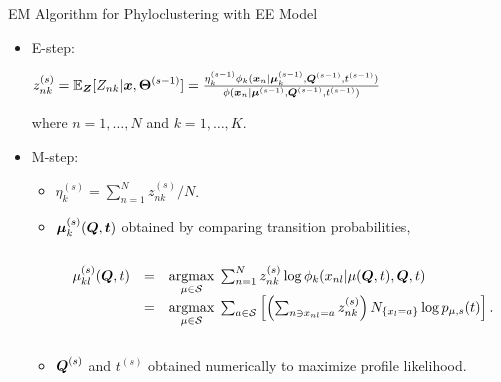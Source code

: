 \documentclass{beamer}
\begin{document}

\begin{frame}{EM Algorithm for Phyloclustering with EE Model}

\begin{itemize}
\item
E-step:
\begin{center}
$
z_{nk}^{(s)} =
\mathbb{E}_{\boldsymbol{Z}} [ Z_{nk} | \boldsymbol{x}, \boldsymbol{\Theta}^{(s-1)} ] =
\frac{
\eta_k^{(s-1)}
\phi_k(\boldsymbol{x}_n|
\boldsymbol{\mu}_k^{(s-1)}, \boldsymbol{Q}^{(s-1)}, t^{(s-1)})
}{
\phi(\boldsymbol{x}_n|
\boldsymbol{\mu}^{(s-1)}, \boldsymbol{Q}^{(s-1)}, t^{(s-1)})
}$
\end{center}
where $n = 1, \ldots, N$ and $k = 1, \ldots, K$.

\item
M-step:

\begin{itemize}
\item
$\eta_k^{(s)} = \sum_{n=1}^N z_{nk}^{(s)} / N$.

\item
$\boldsymbol{\mu}_k^{(s)}(\boldsymbol{Q}, \boldsymbol{t})$ obtained by
comparing transition probabilities,

\vspace{-0.2cm}
\begin{columns}
\begin{column}{\textwidth}
$$
\begin{array}{rcl}
\mu_{kl}^{(s)}(\vect{Q}, t)
 &=& \dargmax{\mu \in \mathcal{S}}
     \sum_{n = 1}^N z_{nk}^{(s)} \log \phi_k(x_{nl}| \mu(\vect{Q}, t), \vect{Q}, t) \\
 &=& \dargmax{\mu \in \mathcal{S}}

\sum_{a \in \mathcal{S}}
\left[
\left(
\sum_{n \ni x_{nl} = a} z_{nk}^{(s)}
\right)
N_{\{x_l = a\}} \log p_{\mu, s}(t)
\right].

\end{array}
$$
\end{column}
\end{columns}
\vspace{0.1cm}

\item
$\boldsymbol{Q}^{(s)}$ and $t^{(s)}$ obtained numerically to maximize profile likelihood.

\end{itemize}

\end{itemize}

\end{frame}
\end{document}
